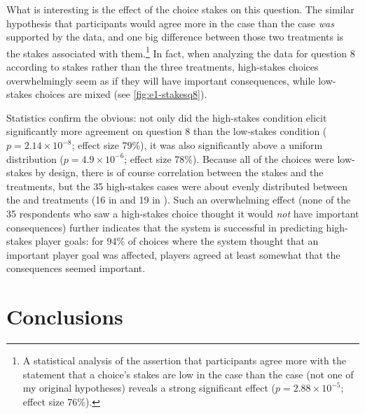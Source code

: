 What is interesting is the effect of the choice stakes on this question.
%
The similar hypothesis that participants would agree more in the \dlm{} case than the \rlx{} case \emph{was} supported by the data, and one big difference between those two treatments is the stakes associated with them.\footnote{A statistical analysis of the assertion that participants agree more with the statement that a choice's stakes are low in the \rlx{} case than the \dlm{} case (not one of my original hypotheses) reveals a strong significant effect ($p = 2.88\times10^{-5}$; effect size 76\%).}
%
In fact, when analyzing the data for question 8 according to stakes rather than the three treatments, high-stakes choices overwhelmingly seem as if they will have important consequences, while low-stakes choices are mixed (see \cref{fig:e1-stakesq8}).


Statistics confirm the obvious: not only did the high-stakes condition elicit significantly more agreement on question 8 than the low-stakes condition ($p = 2.14\times10^{-8}$; effect size 79\%), it was also significantly above a uniform distribution ($p = 4.9\times10^{-6}$; effect size 78\%).
%
Because all of the \rlx{} choices were low-stakes by design, there is of course correlation between the stakes and the treatments, but the 35 high-stakes cases were about evenly distributed between the \obv{} and \dlm{} treatments (16 in \obv{} and 19 in \dlm{}).
%
Such an overwhelming effect (none of the 35 respondents who saw a high-stakes choice thought it would \emph{not} have important consequences) further indicates that the system is successful in predicting high-stakes player goals: for 94\% of choices where the system thought that an important player goal was affected, players agreed at least somewhat that the consequences seemed important.


\section{Conclusions}

